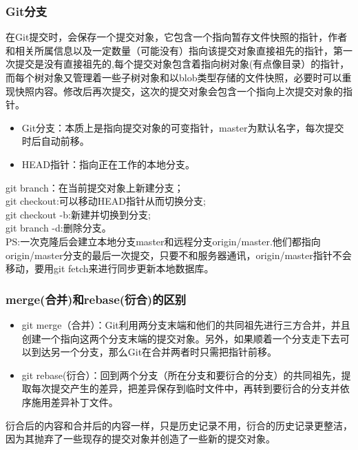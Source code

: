 \documentclass[12pt]{article}
\begin{document}
\begin{flushleft}
\begin{flushleft}
\begin{flushleft}
\begin{flushleft}
\subsubsection{Git分支}
\begin{flushleft}
在Git提交时，会保存一个提交对象，它包含一个指向暂存文件快照的指针，作者和相关所属信息以及一定数量（可能没有）指向该提交对象直接祖先的指针，第一次提交是没有直接祖先的,每个提交对象包含着指向树对象(有点像目录）的指针，而每个树对象又管理着一些子树对象和以blob类型存储的文件快照，必要时可以重现快照内容。修改后再次提交，这次的提交对象会包含一个指向上次提交对象的指针。\\
\begin{itemize}
\item{\color{red}Git分支：}本质上是指向提交对象的可变指针，master为默认名字，每次提交时后自动前移。\\
\item{\color{red}HEAD指针：}指向正在工作的本地分支。\\
\end{itemize}
git branch：在当前提交对象上新建分支；\\
git checkout:可以移动HEAD指针从而切换分支;\\
git checkout -b:新建并切换到分支;\\
git branch -d:删除分支。\\
PS:一次克隆后会建立本地分支master和远程分支origin\slash{}master.他们都指向origin\slash{}master分支的最后一次提交，只要不和服务器通讯，origin\slash{}master指针不会移动，要用git fetch来进行同步更新本地数据库。
\end{flushleft}
\subsubsection{merge(合并)和rebase(衍合)的区别}
\begin{flushleft}
\begin{itemize}
\item {\color{blue}git merge（合并）：}Git利用两分支末端和他们的共同祖先进行三方合并，并且创建一个指向这两个分支末端的提交对象。另外，如果顺着一个分支走下去可以到达另一个分支，那么Git在合并两者时只需把指针前移。\\
\item {\color{blue}git rebase(衍合）：}回到两个分支（所在分支和要衍合的分支）的共同祖先，提取每次提交产生的差异，把差异保存到临时文件中，再转到要衍合的分支并依序施用差异补丁文件。\\
\end{itemize}
{\color{purple}衍合后的内容和合并后的内容一样，只是历史记录不用，衍合的历史记录更整洁，因为其抛弃了一些现存的提交对象并创造了一些新的提交对象。}
\end{flushleft}

\end{flushleft}
\end{flushleft}
\end{flushleft}
\end{flushleft}
\end{document}

